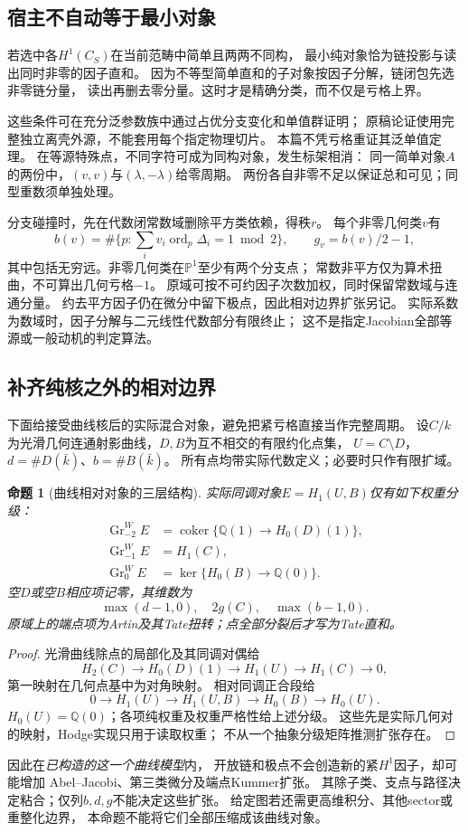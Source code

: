 \documentclass[11pt,a4paper]{ctexart}
\theoremstyle{cnplain}\newtheorem{theorem}{定理}[section]
\newtheorem{proposition}[theorem]{命题}
\theoremstyle{definition}\newtheorem{definition}[theorem]{定义}
\theoremstyle{remark}\newtheorem{remark}[theorem]{注}
\newcommand{\Q}{\mathbb Q}\newcommand{\cC}{\mathcal C}
\begin{document}
\subsection{宿主不自动等于最小对象}
若选中各$H^1(C_S)$在当前范畴中简单且两两不同构，
最小纯对象恰为链投影与读出同时非零的因子直和。
因为不等型简单直和的子对象按因子分解，链闭包先选非零链分量，
读出再删去零分量。这时才是精确分类，而不仅是亏格上界。

这些条件可在充分泛参数族中通过占优分支变化和单值群证明；
原稿论证使用完整独立离壳外源，不能套用每个指定物理切片。
本篇不凭亏格重证其泛单值定理。
在等源特殊点，不同字符可成为同构对象，发生标架相消：
同一简单对象$A$的两份中，$(v,v)$与$(\lambda,-\lambda)$给零周期。
两份各自非零不足以保证总和可见；同型重数须单独处理。

分支碰撞时，先在代数闭常数域删除平方类依赖，得秩$r$。
每个非零几何类$v$有
\[
 b(v)=\#\{p:\sum_i v_i\operatorname{ord}_p\Delta_i=1\bmod2\},
 \qquad g_v=b(v)/2-1 ,
\]
其中包括无穷远。非零几何类在$\mathbb P^1$至少有两个分支点；
常数非平方仅为算术扭曲，不可算出几何亏格$-1$。
原域可按不可约因子次数加权，同时保留常数域与连通分量。
约去平方因子仍在微分中留下极点，因此相对边界扩张另记。
实际系数为数域时，因子分解与二元线性代数部分有限终止；
这不是指定Jacobian全部等源或一般动机的判定算法。

\subsection{补齐纯核之外的相对边界}
下面给接受曲线核后的实际混合对象，避免把紧亏格直接当作完整周期。
设$C/k$为光滑几何连通射影曲线，$D,B$为互不相交的有限约化点集，
$U=C\setminus D$，$d=\#D(\bar k)$、$b=\#B(\bar k)$。
所有点均带实际代数定义；必要时只作有限扩域。

\begin{proposition}[曲线相对对象的三层结构]\label{prop:curve-boundary}
实际同调对象$E=H_1(U,B)$仅有如下权重分级：
\[
 \begin{split}
 \operatorname{Gr}_{-2}^W E
   &=\operatorname{coker}\{\Q(1)\to H_0(D)(1)\},\\
 \operatorname{Gr}_{-1}^W E&=H_1(C),\\
 \operatorname{Gr}_{0}^W E
   &=\ker\{H_0(B)\to\Q(0)\}.
 \end{split}
\]
空$D$或空$B$相应项记零，其维数为
\[
 \max(d-1,0),\quad 2g(C),\quad\max(b-1,0).
\]
原域上的端点项为Artin及其Tate扭转；点全部分裂后才写为Tate直和。
\end{proposition}
\begin{proof}
光滑曲线除点的局部化及其同调对偶给
\[
 H_2(C)\longrightarrow H_0(D)(1)\longrightarrow
 H_1(U)\longrightarrow H_1(C)\longrightarrow0,
\]
第一映射在几何点基中为对角映射。
相对同调正合段给
\[
 0\longrightarrow H_1(U)\longrightarrow H_1(U,B)
 \longrightarrow H_0(B)\longrightarrow H_0(U).
\]
$H_0(U)=\Q(0)$；各项纯权重及权重严格性给上述分级。
这些先是实际几何对的映射，Hodge实现只用于读取权重；
不从一个抽象分级矩阵推测扩张存在。
\end{proof}
因此在\emph{已构造的这一个曲线模型}内，
开放链和极点不会创造新的紧$H^1$因子，却可能增加
Abel--Jacobi、第三类微分及端点Kummer扩张。
其除子类、支点与路径决定粘合；仅列$b,d,g$不能决定这些扩张。
给定图若还需更高维积分、其他sector或重整化边界，
本命题不能将它们全部压缩成该曲线对象。
\end{document}
